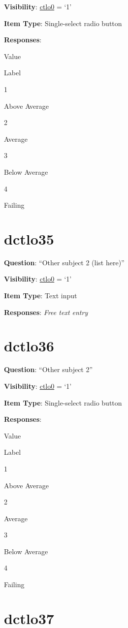 \documentclass[]{book}
\begin{document}
\textbf{Visibility}: \protect\hyperlink{ctlo0}{ctlo0} = `1'

\textbf{Item Type}: Single-select radio button

\textbf{Responses}:

Value

Label

1

Above Average

2

Average

3

Below Average

4

Failing

\hypertarget{dctlo35}{%
\section{dctlo35}\label{dctlo35}}

\textbf{Question}: ``Other subject 2 (list here)''

\textbf{Visibility}: \protect\hyperlink{ctlo0}{ctlo0} = `1'

\textbf{Item Type}: Text input

\textbf{Responses}: \emph{Free text entry}

\hypertarget{dctlo36}{%
\section{dctlo36}\label{dctlo36}}

\textbf{Question}: ``Other subject 2''

\textbf{Visibility}: \protect\hyperlink{ctlo0}{ctlo0} = `1'

\textbf{Item Type}: Single-select radio button

\textbf{Responses}:

Value

Label

1

Above Average

2

Average

3

Below Average

4

Failing

\hypertarget{dctlo37}{%
\section{dctlo37}\label{dctlo37}}
\end{document}
